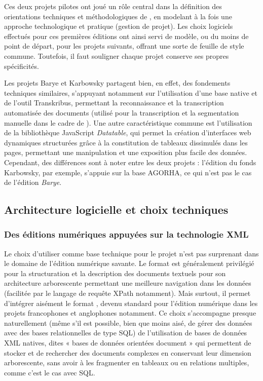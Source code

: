 Ces deux projets pilotes ont joué un rôle central dans la définition des orientations techniques et méthodologiques de \pense, en modelant à la fois une approche technologique et pratique (gestion de projet). Les choix logiciels effectués pour ces premières éditions ont ainsi servi de modèle, ou du moins de point de départ, pour les projets suivants, offrant une sorte de feuille de style commune. Toutefois, il faut souligner chaque projet conserve ses propres spécificités. 

Les projets Barye et Karbowsky partagent bien, en effet, des fondements techniques similaires, s’appuyant notamment sur l’utilisation d’une base \xml native et de l’outil Transkribus, permettant la reconnaissance et la transcription automatisée des documents (utilisé pour la transcription et la segmentation manuelle dans le cadre de \pense). 
Une autre caractéristique commune est l'utilisation de la bibliothèque JavaScript \textit{Datatable}, qui permet la création d'interfaces web dynamiques structurées grâce à la constitution de tableaux \html dissimulés dans les pages, permettant une manipulation et une exposition plus facile des données. Cependant, des différences sont à noter entre les deux projets : l’édition du fonds Karbowsky, par exemple, s’appuie sur la base AGORHA, ce qui n’est pas le cas de l’édition \textit{Barye}.

\subsection{Architecture logicielle et choix techniques}

\subsubsection{Des éditions numériques appuyées sur la technologie XML}

Le choix d'utiliser \xml comme base technique pour le projet \pense n’est pas surprenant dans le domaine de l'édition numérique savante. Le format \xml est généralement privilégié pour la structuration et la description des documents textuels pour son architecture arborescente permettant une meilleure navigation dans les données (facilitée par le langage de requête XPath notamment). Mais surtout, il permet d’intégrer aisément le format \tei, devenu standard pour l’édition numérique dans les projets francophones et anglophones notamment. Ce choix s’accompagne presque naturellement (même s’il est possible, bien que moins aisé, de gérer des données \xml avec des bases relationnelles de type SQL) de l’utilisation de bases de données XML natives, dites « bases de données orientées document » qui permettent de stocker et de rechercher des documents complexes en conservant leur dimension arborescente, sans avoir à les fragmenter en tableaux ou en relations multiples, comme c'est le cas avec SQL. 

